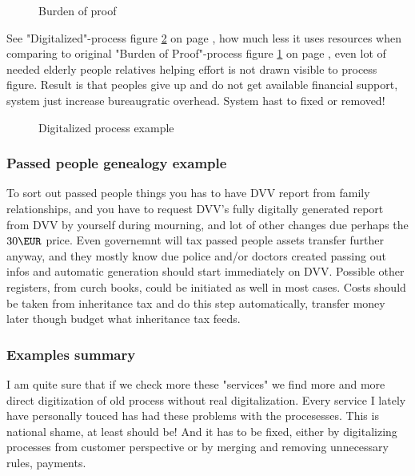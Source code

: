 \begin{figure}
 \begin{center}
  \caption{Burden of proof}
  \label{fig:burdofpr} 
 \end{center}
\end{figure}

See "Digitalized"-process figure \ref{fig:digitalized} on page
\pageref{fig:digitalized}, how much less it uses resources when comparing
to original "Burden of Proof"-process figure \ref{fig:burdofpr} on page
\pageref{fig:burdofpr}, even lot of needed elderly people relatives
helping effort is not drawn visible to process figure.
Result is that peoples give up and do not get available financial
support\cite{ElakelaisetRynJanKoskimiesJaElakeliitonIreneVuorisalo},
system just increase bureaugratic overhead.
System hast to fixed or removed!

\begin{figure}
 \begin{center}
  \caption{Digitalized process example}
  \label{fig:digitalized} 
 \end{center}
\end{figure}

\subsubsection{Passed people genealogy example}
To sort out passed people things you has to have DVV report from family relationships,
and you have to request DVV's fully digitally generated report from DVV by yourself during mourning,
and lot of other changes due perhaps the $30\EUR$ price.
Even governemnt will tax passed people assets transfer further anyway,
and they mostly know due police and/or doctors created passing out infos
and automatic generation should start immediately on DVV.
Possible other registers, from curch books, could be initiated as well in most cases.
Costs should be taken from inheritance tax and do this step automatically,
transfer money later though budget what inheritance tax feeds.

\subsubsection{Examples summary}
I am quite sure that if we check more these "services" we find more and more
direct digitization of old process without real digitalization.
Every service I lately have personally touced has had these problems with the procesesses.
This is national shame, at least should be!
And it has to be fixed, either by digitalizing processes from customer perspective
or by merging and removing unnecessary rules, payments.

